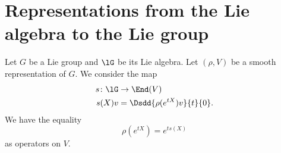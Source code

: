 \section{Representations from the Lie algebra to the Lie group}

\begin{proposition}       \label{PROPooXCGMooKlJlwp}
    Let \( G\) be a Lie group and \( \lG\) be its Lie algebra. Let \( (\rho, V)\) be a smooth representation of \( G\). We consider the map
    \begin{equation}
        \begin{aligned}
            s\colon \lG&\to \End(V) \\
            s(X)v&=\Dsdd{ \rho( e^{tX})v }{t}{0}.
        \end{aligned}
    \end{equation}
    We have the equality
    \begin{equation}
        \rho( e^{tX})= e^{ts(X)}
    \end{equation}
    as operators on \( V\).
\end{proposition}

